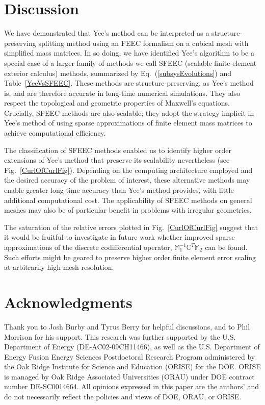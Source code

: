 \documentclass[final,twocolumn]{elsarticle}
\newcommand*\mC{\mathbb{C}}
\newcommand*\mM{\mathbb{M}}
\begin{document}
\section{Discussion\label{ConclusionSect}}

We have demonstrated that Yee's method can be interpreted as a structure-preserving splitting method using an FEEC formalism on a cubical mesh with simplified mass matrices. In so doing, we have identified Yee's algorithm to be a special case of a larger family of methods we call SFEEC (scalable finite element exterior calculus) methods, summarized by Eq.~(\ref{subsysEvolutions}) and Table~\ref{YeeVsSFEEC}. These methods are structure-preserving, as Yee's method is, and are therefore accurate in long-time numerical simulations. They also respect the topological and geometric properties of Maxwell's equations. Crucially, SFEEC methods are also scalable; they adopt the strategy implicit in Yee's method of using sparse approximations of finite element mass matrices to achieve computational efficiency.

The classification of SFEEC methods enabled us to identify higher order extensions of Yee's method that preserve its scalability nevertheless (see Fig.~\ref{CurlOfCurlFig}). Depending on the computing architecture employed and the desired accuracy of the problem of interest, these alternative methods may enable greater long-time accuracy than Yee's method provides, with little additional computational cost. The applicability of SFEEC methods on general meshes may also be of particular benefit in problems with irregular geometries.

The saturation of the relative errors plotted in Fig.~\ref{CurlOfCurlFig} suggest that it would be fruitful to investigate in future work whether improved sparse approximations of the discrete codifferential operator, ${\mM_1^{-1}\mC^T\mM_2}$ can be found. Such efforts might be geared to preserve higher order finite element error scaling at arbitrarily high mesh resolution.

\section{Acknowledgments\label{AckSect}}

Thank you to Josh Burby and Tyrus Berry for helpful discussions, and to Phil Morrison for his support. This research was further supported by the U.S. Department of Energy (DE-AC02-09CH11466), as well as the U.S. Department of Energy Fusion Energy Sciences Postdoctoral Research Program administered by the Oak Ridge Institute for Science and Education (ORISE) for the DOE. ORISE is managed by Oak Ridge Associated Universities (ORAU) under DOE contract number DE-SC0014664. All opinions expressed in this paper are the authors' and do not necessarily reflect the policies and views of DOE, ORAU, or ORISE.



\end{document}
